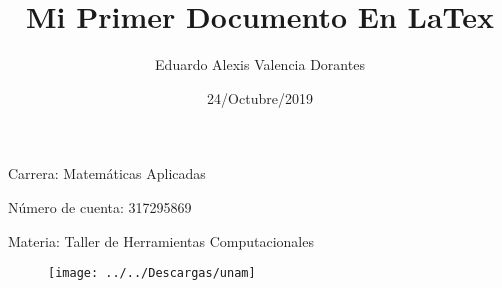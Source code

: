 \documentclass{article}%
\title{Mi Primer Documento En LaTex}
\author{Eduardo Alexis Valencia Dorantes}
\date{24/Octubre/2019}
\begin{document}
	\begin{titlepage}
		\maketitle
	\end{titlepage}

Carrera: Matemáticas Aplicadas

Número de cuenta: 317295869

Materia: Taller de Herramientas Computacionales
\vfill

{\begin{figure}
		\centering
		\texttt{[image: ../../Descargas/unam]}
		\caption{}
		\label{fig:unam}
	\end{figure}
}
\end{document}
